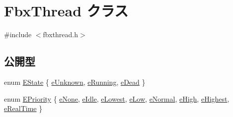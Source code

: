 \hypertarget{class_fbx_thread}{}\section{Fbx\+Thread クラス}
\label{class_fbx_thread}


{\ttfamily \#include $<$fbxthread.\+h$>$}

\subsection*{公開型}
\begin{DoxyCompactItemize}
\item 
enum \hyperlink{class_fbx_thread_a82f55f0fc5f947d4357c8175d05782ff}{E\+State} \{ \hyperlink{class_fbx_thread_a82f55f0fc5f947d4357c8175d05782ffa7f6b0ac2980557bf8caec0ef4358fa2b}{e\+Unknown}, 
\hyperlink{class_fbx_thread_a82f55f0fc5f947d4357c8175d05782ffaa1f5be66ae4462a8a3c14ed992694ef6}{e\+Running}, 
\hyperlink{class_fbx_thread_a82f55f0fc5f947d4357c8175d05782ffaefbf269eef72eafe1490b5763e371ef7}{e\+Dead}
 \}
\item 
enum \hyperlink{class_fbx_thread_a1b7d46235dd8589e03f7a29777f083f2}{E\+Priority} \{ \newline
\hyperlink{class_fbx_thread_a1b7d46235dd8589e03f7a29777f083f2a486f95ff1bf1e4b7e5a91a2dbb599ce2}{e\+None}, 
\hyperlink{class_fbx_thread_a1b7d46235dd8589e03f7a29777f083f2ab86476336f21b901f6d8565d34d491d1}{e\+Idle}, 
\hyperlink{class_fbx_thread_a1b7d46235dd8589e03f7a29777f083f2a61388ca111b65f21b9827f4ab2e83f80}{e\+Lowest}, 
\hyperlink{class_fbx_thread_a1b7d46235dd8589e03f7a29777f083f2ad9ca31e9e733dae665c4686c1fe2eeb8}{e\+Low}, 
\newline
\hyperlink{class_fbx_thread_a1b7d46235dd8589e03f7a29777f083f2a8492d4d5399f261abe00d5645e496027}{e\+Normal}, 
\hyperlink{class_fbx_thread_a1b7d46235dd8589e03f7a29777f083f2afbf320e49b66d3d74630034e2d85bd1b}{e\+High}, 
\hyperlink{class_fbx_thread_a1b7d46235dd8589e03f7a29777f083f2adc9f3aeca8cedcbd2beddad919b31855}{e\+Highest}, 
\hyperlink{class_fbx_thread_a1b7d46235dd8589e03f7a29777f083f2a4a30e49c3822b1307c03a04c958acbcc}{e\+Real\+Time}
 \}
\end{DoxyCompactItemize}
